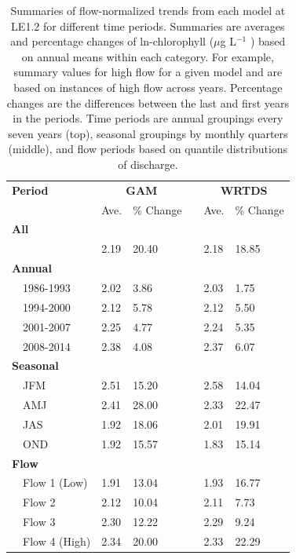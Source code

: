 \documentclass[letterpaper,12pt,oneside]{article}\usepackage[]{graphicx}\usepackage[]{color}
\newcommand{\mugl}{$\mu$g L$^{-1}$ }
\begin{document}
\begin{table}[!tbp]
\caption{Summaries of flow-normalized trends from each model at LE1.2 for different time periods.  Summaries are averages and percentage changes of ln-chlorophyll (\mugl) based on annual means within each category.  For example, summary values for high flow for a given model and are based on instances of high flow across years.  Percentage changes are the differences between the last and first years in the periods.  Time periods are annual groupings every seven years (top), seasonal groupings by monthly quarters (middle), and flow periods based on quantile distributions of discharge.\label{tab:trendsLE12}} 
\begin{center}
\begin{tabular}{lllcll}
\hline\hline
\multicolumn{1}{l}{\bfseries Period}&\multicolumn{2}{c}{\bfseries GAM}&\multicolumn{1}{c}{\bfseries }&\multicolumn{2}{c}{\bfseries WRTDS}\tabularnewline
\cline{2-3} \cline{5-6}
\multicolumn{1}{l}{}&\multicolumn{1}{c}{Ave.}&\multicolumn{1}{c}{\% Change}&\multicolumn{1}{c}{}&\multicolumn{1}{c}{Ave.}&\multicolumn{1}{c}{\% Change}\tabularnewline
\hline
{\bfseries All}&&&&&\tabularnewline
~~&2.19&20.40&&2.18&18.85\tabularnewline
\hline
{\bfseries Annual}&&&&&\tabularnewline
~~1986-1993&2.02& 3.86&&2.03& 1.75\tabularnewline
~~1994-2000&2.12& 5.78&&2.12& 5.50\tabularnewline
~~2001-2007&2.25& 4.77&&2.24& 5.35\tabularnewline
~~2008-2014&2.38& 4.08&&2.37& 6.07\tabularnewline
\hline
{\bfseries Seasonal}&&&&&\tabularnewline
~~JFM&2.51&15.20&&2.58&14.04\tabularnewline
~~AMJ&2.41&28.00&&2.33&22.47\tabularnewline
~~JAS&1.92&18.06&&2.01&19.91\tabularnewline
~~OND&1.92&15.57&&1.83&15.14\tabularnewline
\hline
{\bfseries Flow}&&&&&\tabularnewline
~~Flow 1 (Low)&1.91&13.04&&1.93&16.77\tabularnewline
~~Flow 2&2.12&10.04&&2.11& 7.73\tabularnewline
~~Flow 3&2.30&12.22&&2.29& 9.24\tabularnewline
~~Flow 4 (High)&2.34&20.00&&2.33&22.29\tabularnewline
\hline
\end{tabular}\end{center}

\end{table}
\end{document}
